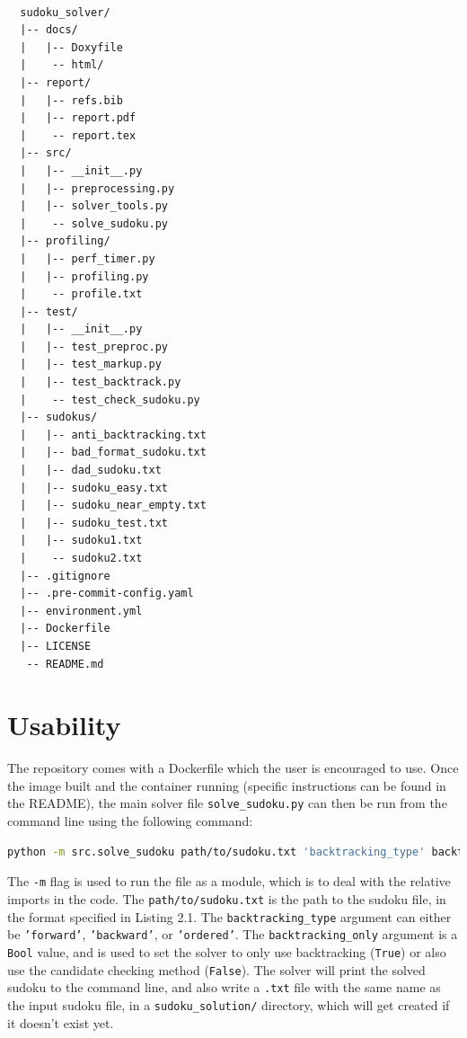 \documentclass[12pt]{report} %
\begin{document}
\begin{lstlisting}[caption={Directory Structure},basicstyle=\tiny]

  sudoku_solver/
  |-- docs/
  |   |-- Doxyfile
  |    -- html/
  |-- report/
  |   |-- refs.bib
  |   |-- report.pdf
  |    -- report.tex
  |-- src/
  |   |-- __init__.py
  |   |-- preprocessing.py
  |   |-- solver_tools.py
  |    -- solve_sudoku.py
  |-- profiling/
  |   |-- perf_timer.py
  |   |-- profiling.py
  |    -- profile.txt
  |-- test/
  |   |-- __init__.py
  |   |-- test_preproc.py
  |   |-- test_markup.py
  |   |-- test_backtrack.py
  |    -- test_check_sudoku.py
  |-- sudokus/
  |   |-- anti_backtracking.txt
  |   |-- bad_format_sudoku.txt
  |   |-- dad_sudoku.txt
  |   |-- sudoku_easy.txt
  |   |-- sudoku_near_empty.txt
  |   |-- sudoku_test.txt
  |   |-- sudoku1.txt
  |    -- sudoku2.txt
  |-- .gitignore
  |-- .pre-commit-config.yaml
  |-- environment.yml
  |-- Dockerfile
  |-- LICENSE
   -- README.md

\end{lstlisting}

\section{Usability}

The repository comes with a Dockerfile which the user is encouraged to use. Once the image built and the container running (specific instructions can be found in the README), the main solver file \texttt{solve\_sudoku.py} can then be run from the command line using the following command:

\begin{lstlisting}[language=bash, caption={How to run the solver}]
  python -m src.solve_sudoku path/to/sudoku.txt 'backtracking_type' backtracking_only
\end{lstlisting}

The \texttt{-m} flag is used to run the file as a module, which is to deal with the relative imports in the code. The \texttt{path/to/sudoku.txt} is the path to the sudoku file, in the format specified in Listing 2.1. The \texttt{backtracking\_type} argument can either be \texttt{'forward'}, \texttt{'backward'}, or \texttt{'ordered'}. The \texttt{backtracking\_only} argument is a \texttt{Bool} value, and is used to set the solver to only use backtracking (\texttt{True}) or also use the candidate checking method (\texttt{False}). The solver will print the solved sudoku to the command line, and also write a \texttt{.txt} file with the same name as the input sudoku file, in a \texttt{sudoku\_solution/} directory, which will get created if it doesn't exist yet.
\end{document}
